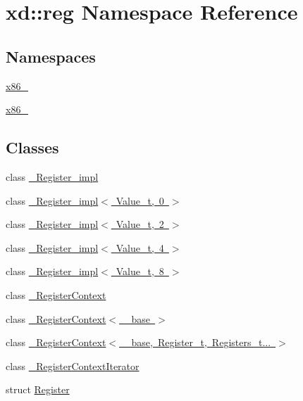 \hypertarget{namespacexd_1_1reg}{}\section{xd\+:\+:reg Namespace Reference}
\label{namespacexd_1_1reg}
\subsection*{Namespaces}
\begin{DoxyCompactItemize}
\item 
 \mbox{\hyperlink{namespacexd_1_1reg_1_1x86__32}{x86\+\_}}
\item 
 \mbox{\hyperlink{namespacexd_1_1reg_1_1x86__64}{x86\+\_}}
\end{DoxyCompactItemize}
\subsection*{Classes}
\begin{DoxyCompactItemize}
\item 
class \mbox{\hyperlink{classxd_1_1reg_1_1___register__impl}{\+\_\+\+Register\+\_\+impl}}
\item 
class \mbox{\hyperlink{classxd_1_1reg_1_1___register__impl_3_01_value__t_00_010_01_4}{\+\_\+\+Register\+\_\+impl$<$ Value\+\_\+t, 0 $>$}}
\item 
class \mbox{\hyperlink{classxd_1_1reg_1_1___register__impl_3_01_value__t_00_012_01_4}{\+\_\+\+Register\+\_\+impl$<$ Value\+\_\+t, 2 $>$}}
\item 
class \mbox{\hyperlink{classxd_1_1reg_1_1___register__impl_3_01_value__t_00_014_01_4}{\+\_\+\+Register\+\_\+impl$<$ Value\+\_\+t, 4 $>$}}
\item 
class \mbox{\hyperlink{classxd_1_1reg_1_1___register__impl_3_01_value__t_00_018_01_4}{\+\_\+\+Register\+\_\+impl$<$ Value\+\_\+t, 8 $>$}}
\item 
class \mbox{\hyperlink{classxd_1_1reg_1_1___register_context}{\+\_\+\+Register\+Context}}
\item 
class \mbox{\hyperlink{classxd_1_1reg_1_1___register_context_3_01__base_01_4}{\+\_\+\+Register\+Context$<$ \+\_\+base $>$}}
\item 
class \mbox{\hyperlink{classxd_1_1reg_1_1___register_context_3_01__base_00_01_register__t_00_01_registers__t_8_8_8_01_4}{\+\_\+\+Register\+Context$<$ \+\_\+base, Register\+\_\+t, Registers\+\_\+t... $>$}}
\item 
class \mbox{\hyperlink{classxd_1_1reg_1_1___register_context_iterator}{\+\_\+\+Register\+Context\+Iterator}}
\item 
struct \mbox{\hyperlink{structxd_1_1reg_1_1_register}{Register}}
\end{DoxyCompactItemize}
